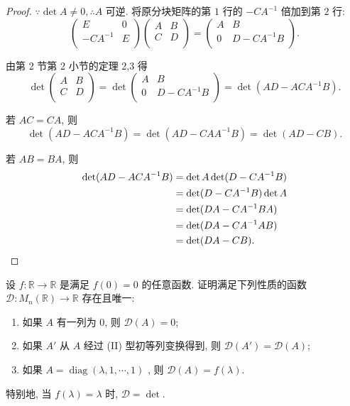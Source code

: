 \documentclass{ctexart}
\begin{document}
\begin{proof}
    $\because\det A\neq0,\therefore A$ 可逆. 将原分块矩阵的第 $1$ 行的 $-CA^{-1}$ 倍加到第 $2$ 行:
    \[\begin{pmatrix}
        E & 0 \\
        -CA^{-1} & E \\
    \end{pmatrix}\begin{pmatrix}
        A & B \\
        C & D \\
    \end{pmatrix}=\begin{pmatrix}
        A & B \\
        0 & D-CA^{-1}B \\
    \end{pmatrix}.\]

    由第 2 节第 2 小节的定理 2,3 得
    \[\det\begin{pmatrix}
        A & B \\
        C & D \\
    \end{pmatrix}=\det\begin{pmatrix}
        A & B \\
        0 & D-CA^{-1}B \\
    \end{pmatrix}=\det(AD-ACA^{-1}B).\]

    若 $AC=CA$, 则
    \[\det(AD-ACA^{-1}B)=\det(AD-CAA^{-1}B)=\det(AD-CB).\]

    若 $AB=BA$, 则
    \begin{align*}
        \det(AD-ACA^{-1}B) & =\det A\det(D-CA^{-1}B) \\
        & =\det(D-CA^{-1}B)\det A \\
        & =\det(DA-CA^{-1}BA) \\
        & =\det(DA-CA^{-1}AB) \\
        & =\det(DA-CB).\qedhere
    \end{align*}
\end{proof}
\begin{exercise}[4.1]
    设 $f:\mathbb{R}\to\mathbb{R}$ 是满足 $f(0)=0$ 的任意函数. 证明满足下列性质的函数 $\mathcal{D}:M_n(\mathbb{R})\to\mathbb{R}$ 存在且唯一:
    \begin{enumerate}
        \item 如果 $A$ 有一列为 $0$, 则 $\mathcal{D}(A)=0$;
        \item 如果 $A'$ 从 $A$ 经过 (II) 型初等列变换得到, 则 $\mathcal{D}(A')=\mathcal{D}(A)$;
        \item 如果 $A=\operatorname{diag}(\lambda,1,\cdots,1)$ , 则 $\mathcal{D}(A)=f(\lambda)$.
    \end{enumerate}

    特别地, 当 $f(\lambda)=\lambda$ 时, $\mathcal{D}=\det$.
\end{exercise}
\end{document}
